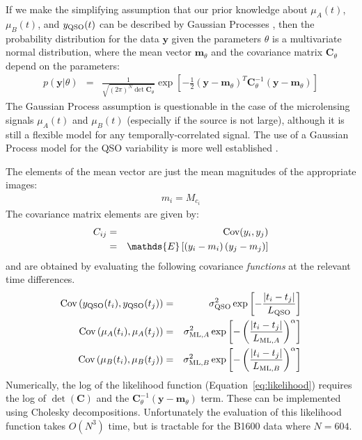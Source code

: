 \documentclass[a4paper, 10pt]{article}
\newcommand{\yy}{\mathbf{y}}
\newcommand{\mm}{\mathbf{m}_\theta}
\newcommand{\CC}{\mathbf{C}_\theta}
\begin{document}
If we make the simplifying assumption that our prior knowledge about
$\mu_A(t)$, $\mu_B(t)$, and
$y_{\rm QSO}(t)$ can be described by Gaussian Processes \citep{rasmussen},
then the probability distribution for the data $\yy$ given the parameters
$\theta$
is a multivariate normal distribution, where the mean vector $\mm$
and the covariance matrix $\CC$ depend on the parameters:
\begin{eqnarray}
p(\yy | \theta) &=& \frac{1}{\sqrt{(2\pi)^N\det{\CC}}}
\exp\left[
-\frac{1}{2}
\left(
\yy - \mm
\right)^T
\CC^{-1}
\left(
\yy - \mm
\right)
\right]\label{eq:likelihood}
\end{eqnarray}
The Gaussian Process assumption is questionable in the case of the microlensing
signals $\mu_A(t)$ and $\mu_B(t)$ (especially if the source is not large),
although it is still a flexible model for any temporally-correlated signal.
The use of a Gaussian Process model for the QSO variability is more
well established \citep{kelly, xu}.

The elements of the mean vector are just the mean magnitudes of the
appropriate images:
\begin{eqnarray}
m_i = M_{c_i}
\end{eqnarray}
The covariance matrix elements are given by:
\begin{eqnarray}
C_{ij} &=& \textnormal{Cov}(y_i, y_j) \\
&=& \mathds{E}\left[
\left(y_i - m_i\right)
\left(y_j - m_j\right)
\right]
\end{eqnarray}
and are obtained by evaluating the following covariance {\it functions}
at the relevant time differences.
\begin{eqnarray}
\textnormal{Cov}\left(y_{\rm QSO}(t_i), y_{\rm QSO}(t_j)\right)
&=& \sigma_{\rm QSO}^2\exp\left[-\frac{\left|t_i - t_j\right|}{L_{\rm QSO}}\right]\\
\textnormal{Cov}\left(\mu_A(t_i), \mu_A(t_j)\right)
&=& \sigma_{{\rm ML}, A}^2\exp\left[-\left(\frac{\left|t_i - t_j\right|}{L_{{\rm ML}, A}}\right)^\alpha\right]\\
\textnormal{Cov}\left(\mu_B(t_i), \mu_B(t_j)\right)
&=& \sigma_{{\rm ML}, B}^2\exp\left[-\left(\frac{\left|t_i - t_j\right|}{L_{{\rm ML}, B}}\right)^\alpha\right]
\end{eqnarray}
Numerically, the log of the likelihood function (Equation~\ref{eq:likelihood})
requires the log of $\det(\mathbf{C})$ and the
$\CC^{-1}\left(\yy - \mm\right)$ term. These can be implemented using
Cholesky decompositions. Unfortunately the evaluation of this likelihood
function takes $O(N^3)$ time, but is tractable for the B1600 data where $N=604$.
\end{document}

